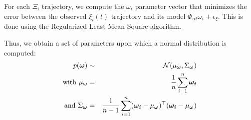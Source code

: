 \documentclass[runningheads,a4paper]{llncs}
\begin{document}
For each $\Xi_i$ trajectory, we compute the $\omega_i$ parameter vector that minimizes the error between the observed $\xi_i(t)$ trajectory and its model $\Phi_{\alpha t} \omega_i + \epsilon_\xi$. This is done using the Regularized Least Mean Square algorithm.

Thus, we obtain a set of parameters
upon which a normal distribution is computed:
\begin{eqnarray}
p(\boldsymbol{\omega}) & \sim & \mathcal{N}(\mu_{\boldsymbol{\omega}}, \Sigma_{\boldsymbol{\omega}})\\
\mathrm{with }~\mu_{\boldsymbol{\omega}} & = & {1 \over n} \sum_{i=1}^n \boldsymbol{\omega_i} \\
\mathrm{and }~\Sigma_{\boldsymbol{\omega}} & = & {1 \over n-1} \sum_{i=1}^n (\boldsymbol{\omega_i} - \mu_{\boldsymbol{\omega}})^\top (\boldsymbol{\omega_i} - \mu_{\boldsymbol{\omega}})
\end{eqnarray}





%
%
\end{document}
